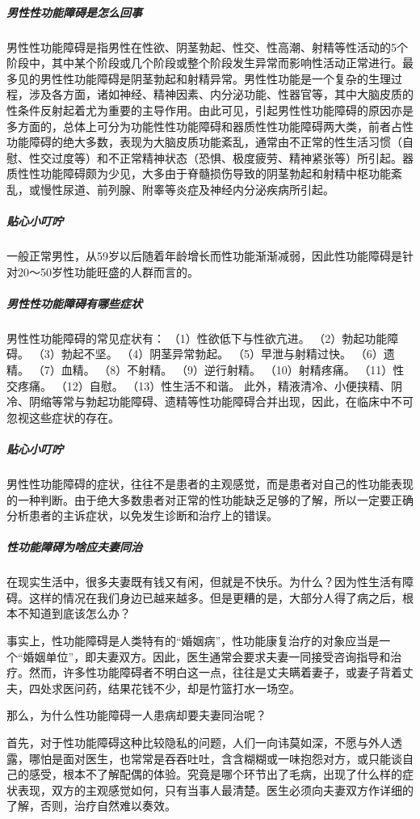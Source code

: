\subparagraph{男性性功能障碍是怎么回事}

男性性功能障碍是指男性在性欲、阴茎勃起、性交、性高潮、射精等性活动的5个阶段中，其中某个阶段或几个阶段或整个阶段发生异常而影响性活动正常进行。最多见的男性性功能障碍是阴茎勃起和射精异常。男性性功能是一个复杂的生理过程，涉及各方面，诸如神经、精神因素、内分泌功能、性器官等，其中大脑皮质的性条件反射起着尤为重要的主导作用。由此可见，引起男性性功能障碍的原因亦是多方面的，总体上可分为功能性性功能障碍和器质性性功能障碍两大类，前者占性功能障碍的绝大多数，表现为大脑皮质功能紊乱，通常由不正常的性生活习惯（自慰、性交过度等）和不正常精神状态（恐惧、极度疲劳、精神紧张等）所引起。器质性性功能障碍颇为少见，大多由于脊髓损伤导致的阴茎勃起和射精中枢功能紊乱，或慢性尿道、前列腺、附睾等炎症及神经内分泌疾病所引起。

\subparagraph{贴心小叮咛}

一般正常男性，从59岁以后随着年龄增长而性功能渐渐减弱，因此性功能障碍是针对20～50岁性功能旺盛的人群而言的。

\subparagraph{男性性功能障碍有哪些症状}

男性性功能障碍的常见症状有：
 （1）性欲低下与性欲亢进。
 （2）勃起功能障碍。
 （3）勃起不坚。
 （4）阴茎异常勃起。
 （5）早泄与射精过快。
 （6）遗精。
 （7）血精。
 （8）不射精。
 （9）逆行射精。
 （10）射精疼痛。
 （11）性交疼痛。
 （12）自慰。
 （13）性生活不和谐。
 此外，精液清冷、小便挟精、阴冷、阴缩等常与勃起功能障碍、遗精等性功能障碍合并出现，因此，在临床中不可忽视这些症状的存在。

\subparagraph{贴心小叮咛}

男性性功能障碍的症状，往往不是患者的主观感觉，而是患者对自己的性功能表现的一种判断。由于绝大多数患者对正常的性功能缺乏足够的了解，所以一定要正确分析患者的主诉症状，以免发生诊断和治疗上的错误。

\subparagraph{性功能障碍为啥应夫妻同治}

在现实生活中，很多夫妻既有钱又有闲，但就是不快乐。为什么？因为性生活有障碍。这样的情况在我们身边已越来越多。但是更糟的是，大部分人得了病之后，根本不知道到底该怎么办？

事实上，性功能障碍是人类特有的“婚姻病”，性功能康复治疗的对象应当是一个“婚姻单位”，即夫妻双方。因此，医生通常会要求夫妻一同接受咨询指导和治疗。然而，许多性功能障碍者不明白这一点，往往是丈夫瞒着妻子，或妻子背着丈夫，四处求医问药，结果花钱不少，却是竹篮打水一场空。

那么，为什么性功能障碍一人患病却要夫妻同治呢？

首先，对于性功能障碍这种比较隐私的问题，人们一向讳莫如深，不愿与外人透露，哪怕是面对医生，也常常是吞吞吐吐，含含糊糊或一味抱怨对方，或只能谈自己的感受，根本不了解配偶的体验。究竟是哪个环节出了毛病，出现了什么样的症状表现，双方的主观感觉如何，只有当事人最清楚。医生必须向夫妻双方作详细的了解，否则，治疗自然难以奏效。

